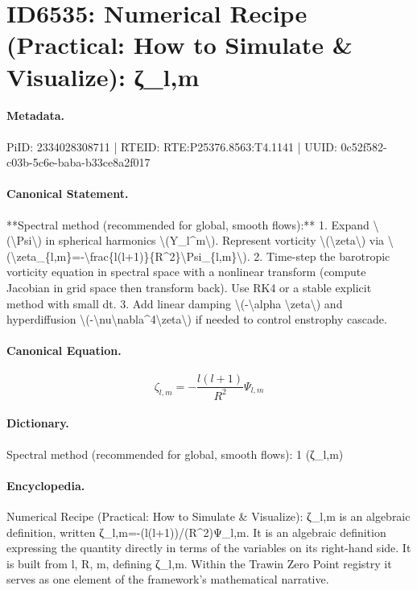 \section*{ID6535: Numerical Recipe (Practical: How to Simulate \& Visualize): ζ\_l,m}
\paragraph{Metadata.}
PiID: 2334028308711 | RTEID: RTE:P25376.8563:T4.1141 | UUID: 0c52f582-c03b-5c6e-baba-b33ce8a2f017

\paragraph{Canonical Statement.}
**Spectral method (recommended for global, smooth flows):** 1. Expand \textbackslash{}(\textbackslash{}Psi\textbackslash{}) in spherical harmonics \textbackslash{}(Y\_l\textasciicircum{}m\textbackslash{}). Represent vorticity \textbackslash{}(\textbackslash{}zeta\textbackslash{}) via \textbackslash{}(\textbackslash{}zeta\_\{l,m\}=-\textbackslash{}frac\{l(l+1)\}\{R\textasciicircum{}2\}\textbackslash{}Psi\_\{l,m\}\textbackslash{}). 2. Time-step the barotropic vorticity equation in spectral space with a nonlinear transform (compute Jacobian in grid space then transform back). Use RK4 or a stable explicit method with small dt. 3. Add linear damping \textbackslash{}(-\textbackslash{}alpha \textbackslash{}zeta\textbackslash{}) and hyperdiffusion \textbackslash{}(-\textbackslash{}nu\textbackslash{}nabla\textasciicircum{}4\textbackslash{}zeta\textbackslash{}) if needed to control enstrophy cascade.

\paragraph{Canonical Equation.}
\[
\zeta_{l,m}=-\frac{l(l+1)}{R^2}\Psi_{l,m}
\]

\paragraph{Dictionary.}
Spectral method (recommended for global, smooth flows): 1 (ζ\_l,m)

\paragraph{Encyclopedia.}
Numerical Recipe (Practical: How to Simulate \& Visualize): ζ\_l,m is an algebraic definition, written ζ\_l,m=-(l(l+1))/(R\textasciicircum{}2)Ψ\_l,m. It is an algebraic definition expressing the quantity directly in terms of the variables on its right-hand side. It is built from l, R, m, defining ζ\_l,m. Within the Trawin Zero Point registry it serves as one element of the framework's mathematical narrative.
